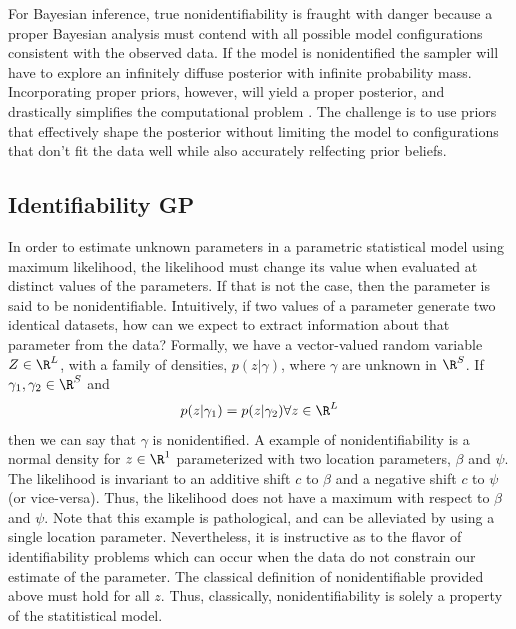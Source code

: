 \documentclass{article}
\begin{document}
For Bayesian inference, true nonidentifiability is fraught with danger because
a proper Bayesian analysis must contend with all possible model configurations
consistent with the observed data. If the model is nonidentified the sampler
will have to explore an infinitely diffuse posterior with infinite
probability mass. Incorporating proper priors, however, will yield a proper
posterior, and drastically simplifies the computational problem
\cite{xie2004note}. The challenge is to use priors that effectively shape the
posterior without limiting the model to configurations that don't fit the data
well while also accurately relfecting prior beliefs. 

\subsection{Identifiability GP}


In order to estimate unknown parameters in a parametric statistical model using
maximum likelihood, the likelihood must change its value when evaluated at
distinct values of the parameters. If that is not the case, then the parameter
is said to be nonidentifiable. Intuitively, if two values of a parameter
generate two identical datasets, how can we expect to extract information about
that parameter from the data? Formally, we have a vector-valued random variable
$Z \in \R^L$, with a family of densities, $p(z | \gamma)$, where $\gamma$ are
unknown in $\R^S$. If $\gamma_1, \gamma_2 \in \R^S$ and 
\begin{align*}
  p(z | \gamma_1) = p(z | \gamma_2) \forall z \in \R^L
\end{align*}
then we can say that $\gamma$ is nonidentified. A example of nonidentifiability
is a normal density for $z \in \R^1$ parameterized with two location
parameters, $\beta$ and $\psi$. The likelihood is invariant to an additive
shift $c$ to $\beta$ and a negative shift $c$ to $\psi$ (or vice-versa). Thus,
the likelihood does not have a maximum with respect to $\beta$ and $\psi$. Note
that this example is pathological, and can be alleviated by using a single
location parameter. Nevertheless, it is instructive as to the flavor of
identifiability problems which can occur when the data do not constrain our
estimate of the parameter. The classical definition of nonidentifiable provided
above must hold for all $z$. Thus, classically, nonidentifiability is solely a
property of the statitistical model.
\end{document}
